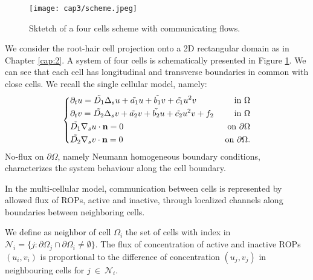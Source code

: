\begin{figure}
  \centering
  \texttt{[image: cap3/scheme.jpeg]}
  \caption{Sktetch of a four cells scheme with communicating flows.}
  \label{fig:2cell}
\end{figure}
We consider the root-hair cell projection onto a 2D rectangular domain as in Chapter \ref{cap:2}. A system of four cells is schematically presented in Figure \ref{fig:2cell}. We can see that each cell has longitudinal and transverse boundaries in common with close cells.
We recall the single cellular model, namely:
\begin{equation} \label{eq:singModel}
\left\lbrace
\begin{matrix}
  \begin{aligned}
    & \partial_t u = \Tilde{D_1} \Delta_s u + \Tilde{a_1} u + \Tilde{b_1} v + \Tilde{c_1} u^2 v & \ \text{in} \ \Omega\\
    & \partial_t v = \Tilde{D_2} \Delta_s v + \Tilde{a_2} v + \Tilde{b_2} u + \Tilde{c_2} u^2 v + f_2 & \ \text{in} \ \Omega \\
    & \Tilde{D_1} \nabla_s u \cdot \mathbf{n} = 0 & \ \text{on} \ \partial \Omega \\
    & \Tilde{D_2} \nabla_s v \cdot \mathbf{n} = 0 & \ \text{on} \ \partial \Omega.
  \end{aligned}
\end{matrix}
\right.
\end{equation}
No-flux on $\partial \Omega$, namely Neumann homogeneous boundary conditions, characterizes the system behaviour along the cell boundary.

In the multi-cellular model, communication between cells is represented by allowed flux of ROPs, active and inactive, through localized channels along boundaries between neighboring cells.

We define as neighbor of cell $\Omega_i$ the set of cells with index in $\mathcal{N}_i = \{ j : \partial \Omega_j  \cap \partial \Omega_i \neq \emptyset \}$. The flux of concentration of active and inactive ROPs $(u_i, v_i)$ is proportional to the difference of concentration $(u_j, v_j)$ in neighbouring cells for $j \ \in \ \mathcal{N}_i$.

